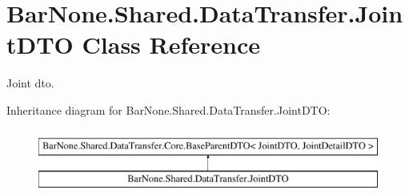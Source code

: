 \hypertarget{class_bar_none_1_1_shared_1_1_data_transfer_1_1_joint_d_t_o}{}\section{Bar\+None.\+Shared.\+Data\+Transfer.\+Joint\+D\+TO Class Reference}
\label{class_bar_none_1_1_shared_1_1_data_transfer_1_1_joint_d_t_o}


Joint dto.  


Inheritance diagram for Bar\+None.\+Shared.\+Data\+Transfer.\+Joint\+D\+TO\+:\begin{figure}[H]
\begin{center}
\leavevmode
\includegraphics[height=2.000000cm]{class_bar_none_1_1_shared_1_1_data_transfer_1_1_joint_d_t_o}
\end{center}
\end{figure}
